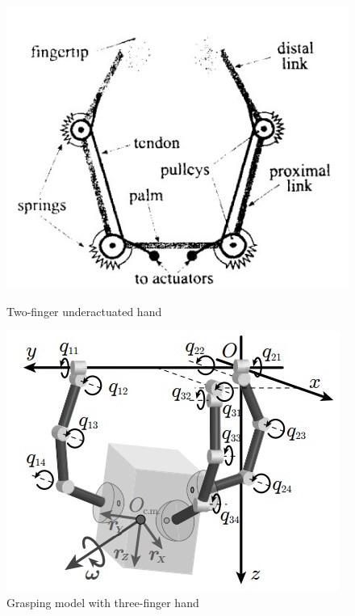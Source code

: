 \documentclass[a4paper,twoside,12pt,papersize, dvipdfmx]{iirthesis}
\begin{document}
\begin{figure}[b]
\begin{minipage}{0.49\hsize}
\centering
\includegraphics[width=0.9\hsize]{fig/Introduction/Ospina/handmodel.jpg}
\caption{Two-finger underactuated hand \cite{ospina2020}}
\label{fig::ohand}
\end{minipage} \hfill
\begin{minipage}{0.49\hsize}
\centering
\includegraphics[width=0.9\hsize]{fig/Introduction/tahara/modeling.jpg}
\caption{Grasping model with three-finger hand \cite{tahara2020}}
\label{fig::model}
\end{minipage}
\end{figure}
\end{document}
